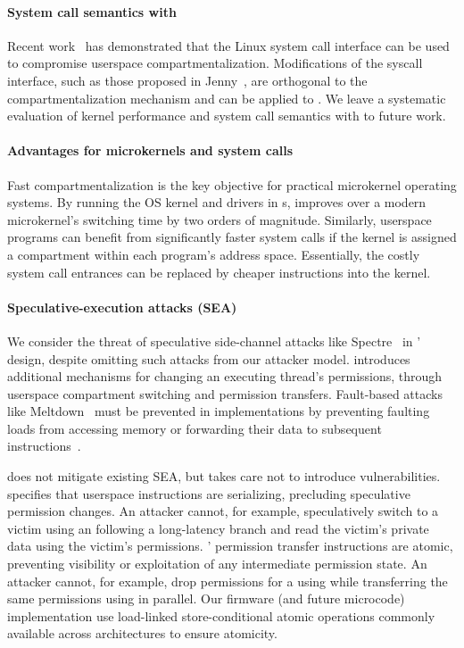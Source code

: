 \paragraph{System call semantics with \seccells}
Recent work~\cite{ConnorMSS20} has demonstrated that the Linux system call
interface can be used to compromise userspace compartmentalization.
Modifications of the syscall interface, such as those proposed in 
Jenny~\cite{schrammel2022jenny}, are orthogonal to the compartmentalization
mechanism and can be applied to \seccells.
We leave a systematic evaluation of kernel performance and 
system call semantics with \seccells to future work.

\paragraph{Advantages for microkernels and system calls}
Fast compartmentalization is the key objective for practical microkernel
operating systems.
By running the OS kernel and drivers in \secdiv{}s, \seccells improves over
a modern microkernel's switching time by two orders of magnitude.
Similarly, userspace programs can benefit from significantly faster system
calls if the kernel is assigned a compartment within each program's address
space.
Essentially, the costly system call entrances can be replaced by cheaper
\sdswitch instructions into the kernel.  

\paragraph{Speculative-execution attacks (SEA)}
We consider the threat of speculative side-channel attacks like 
Spectre~\cite{KocherHFGGHHLM019} in \seccells' design, despite 
omitting such attacks from our attacker model.
\seccells{} introduces additional mechanisms for changing an executing
thread's permissions, through userspace compartment switching and
permission transfers.
Fault-based attacks like Meltdown~\cite{lipp18sec} must be prevented in
implementations by preventing faulting loads from accessing memory or
forwarding their data to subsequent instructions~\cite{WeisseNLWK19}.

\seccells does not mitigate existing SEA, but takes care
not to introduce vulnerabilities.
\seccells specifies that userspace instructions are serializing, 
precluding speculative permission changes.
An attacker cannot, for example, speculatively switch to a victim
\secdiv using an \sdswitch following a long-latency branch and read 
the victim's private data using the victim's permissions.
\seccells' permission transfer instructions are atomic, preventing visibility 
or exploitation of any intermediate permission state.
An attacker \secdiv cannot, for example, drop permissions for a \cell
using \scprot while transferring the same permissions using \sctfer in parallel.
Our firmware (and future microcode) implementation use load-linked 
store-conditional atomic operations commonly available across architectures
to ensure atomicity.


